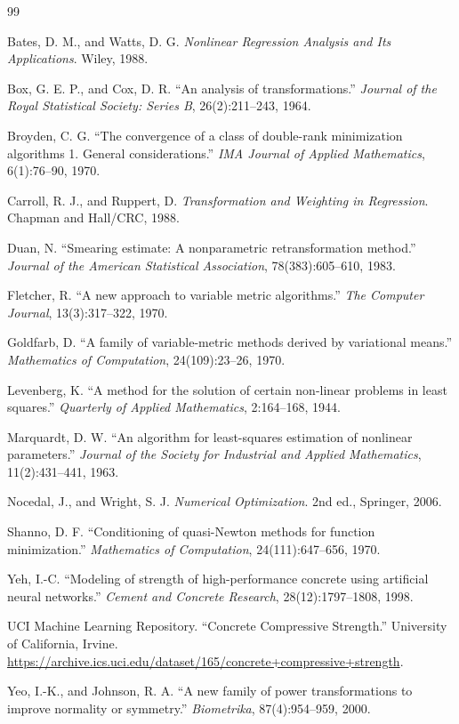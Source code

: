 \documentclass[11pt]{article}
\begin{document}
\begin{thebibliography}{99}
\setlength{\itemsep}{0.1em}

Bates, D. M., and Watts, D. G. \textit{Nonlinear Regression Analysis and Its Applications}. Wiley, 1988.

Box, G. E. P., and Cox, D. R. ``An analysis of transformations.'' \textit{Journal of the Royal Statistical Society: Series B}, 26(2):211--243, 1964.

Broyden, C. G. ``The convergence of a class of double-rank minimization algorithms 1. General considerations.'' \textit{IMA Journal of Applied Mathematics}, 6(1):76--90, 1970.

Carroll, R. J., and Ruppert, D. \textit{Transformation and Weighting in Regression}. Chapman and Hall/CRC, 1988.

Duan, N. ``Smearing estimate: A nonparametric retransformation method.'' \textit{Journal of the American Statistical Association}, 78(383):605--610, 1983.

Fletcher, R. ``A new approach to variable metric algorithms.'' \textit{The Computer Journal}, 13(3):317--322, 1970.

Goldfarb, D. ``A family of variable-metric methods derived by variational means.'' \textit{Mathematics of Computation}, 24(109):23--26, 1970.

Levenberg, K. ``A method for the solution of certain non-linear problems in least squares.'' \textit{Quarterly of Applied Mathematics}, 2:164--168, 1944.

Marquardt, D. W. ``An algorithm for least-squares estimation of nonlinear parameters.'' \textit{Journal of the Society for Industrial and Applied Mathematics}, 11(2):431--441, 1963.

Nocedal, J., and Wright, S. J. \textit{Numerical Optimization}. 2nd ed., Springer, 2006.

Shanno, D. F. ``Conditioning of quasi-Newton methods for function minimization.'' \textit{Mathematics of Computation}, 24(111):647--656, 1970.

Yeh, I.-C. ``Modeling of strength of high-performance concrete using artificial neural networks.'' \textit{Cement and Concrete Research}, 28(12):1797--1808, 1998.

UCI Machine Learning Repository. ``Concrete Compressive Strength.'' University of California, Irvine. \url{https://archive.ics.uci.edu/dataset/165/concrete+compressive+strength}.

Yeo, I.-K., and Johnson, R. A. ``A new family of power transformations to improve normality or symmetry.'' \textit{Biometrika}, 87(4):954--959, 2000.
\end{thebibliography}
\end{document}
